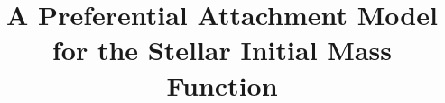 \documentclass[ejs]{imsart}
\numberwithin{equation}{section}
\theoremstyle{plain}
\begin{document}
\begin{frontmatter}
\title{A Preferential Attachment Model for the Stellar Initial Mass Function}

\begin{aug}
\author{ %
}
\address{Department of Statistics \& Data Science \\
Yale University \\
New Haven, CT 06511\\
}

\author{ }
\address{Savvysherpa \\
Minneapolis, MN 55430 \\
}

\author{ 
}
\address{Department of Statistics \& Data Science\\
Carnegie Mellon University \\
Pittsburgh, PA, 15213 \\
\\
}




\end{aug}


\end{frontmatter}
\end{document}
